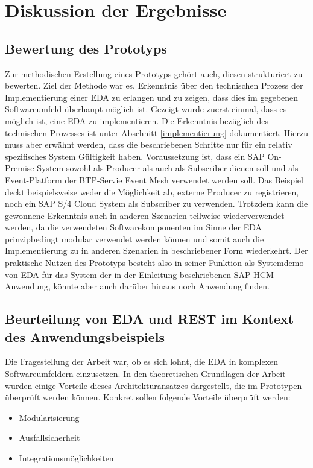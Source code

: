 \section{Diskussion der Ergebnisse}
\subsection{Bewertung des Prototyps}
Zur methodischen Erstellung eines Prototyps gehört auch, diesen strukturiert zu bewerten. Ziel der Methode war es, Erkenntnis über den technischen Prozess der Implementierung einer \ac{EDA} zu erlangen und zu zeigen, dass dies im gegebenen Softwareumfeld überhaupt möglich ist. 
Gezeigt wurde zuerst einmal, dass es möglich ist, eine \ac{EDA} zu implementieren. Die Erkenntnis bezüglich des technischen Prozesses ist unter Abschnitt \ref{implementierung} dokumentiert. Hierzu muss aber erwähnt werden, dass die beschriebenen Schritte nur für ein relativ spezifisches System Gültigkeit haben. Voraussetzung ist, dass ein SAP On-Premise System sowohl als Producer als auch als Subscriber dienen soll und als Event-Platform der BTP-Servie Event Mesh verwendet werden soll. Das Beispiel deckt beispielsweise weder die Möglichkeit ab, externe Producer zu registrieren, noch ein SAP S/4 Cloud System als Subscriber zu verwenden. 
Trotzdem kann die gewonnene Erkenntnis auch in anderen Szenarien teilweise wiederverwendet werden, da die verwendeten Softwarekomponenten im Sinne der \ac{EDA} prinzipbedingt modular verwendet werden können und somit auch die Implementierung zu in anderen Szenarien in beschriebener Form wiederkehrt.
Der praktische Nutzen des Prototyps besteht also in seiner Funktion als Systemdemo von \ac{EDA} für das System der in der Einleitung beschriebenen SAP HCM Anwendung, könnte aber auch darüber hinaus noch Anwendung finden.

\subsection{Beurteilung von EDA und REST im Kontext des Anwendungsbeispiels}
Die Fragestellung der Arbeit war, ob es sich lohnt, die \ac{EDA} in komplexen Softwareumfeldern einzusetzen. In den theoretischen Grundlagen der Arbeit wurden einige Vorteile dieses Architekturansatzes dargestellt, die im Prototypen überprüft werden können. Konkret sollen folgende Vorteile überprüft werden:
\begin{itemize}
    \item Modularisierung
    \item Ausfallsicherheit
    \item Integrationsmöglichkeiten
\end{itemize}

